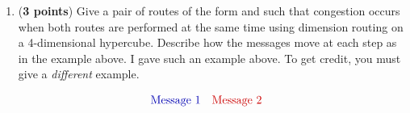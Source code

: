 \documentclass{article}
\newenvironment{answer}
{\color{blue}}
{\normalfont}
\newcounter{enumiisave}
\begin{document}
\begin{enumerate}
\begin{enumerate}
\begin{answer}
\begin{displaymath}
\begin{array}{rcl|rcl|l}
                                \code{[1,1,1,1]}                                        & \rightarrow & \code{[1,1,1,1]}                  &
                                \code{\color{MediumRed}[0,0,0,0]}                       & \rightarrow & \code{\color{MediumRed}[0,0,1,0]} &
                                \code{\xcomment{route on address bit 2}}                                                                    \\
                                \code{[1,1,1,1]}                                        & \rightarrow & \code{[1,1,1,0]}                  &
                                \code{\color{MediumRed}[0,0,0,0]}                       & \rightarrow & \code{\color{MediumRed}[0,0,1,0]} &
                                \code{\xcomment{route on address bit 3}}
                            \end{array}\end{displaymath}
                    \end{answer}
              \item (\textbf{3 points})\setcounter{enumiisave}{\value{enumii}}
                    Give a pair of routes of the form  and
                     such that congestion occurs when both routes are performed at the
                    same time using dimension routing on a 4-dimensional hypercube.
                    Describe how the messages move at each step as in the example above.
                    I gave such an example above.  To get credit, you must give a \emph{different} example.
                    \begin{answer}
                        \begin{displaymath}\begin{array}{rcl|rcl|l}
                                \multicolumn{3}{c}{\color{CodeColor}\textrm{Message 1}} &
                                \multicolumn{3}{c}{\color{MediumRed}\textrm{Message 2}} &

\end{array}
\end{displaymath}
\end{answer}
\end{enumerate}
\end{enumerate}
\end{document}
